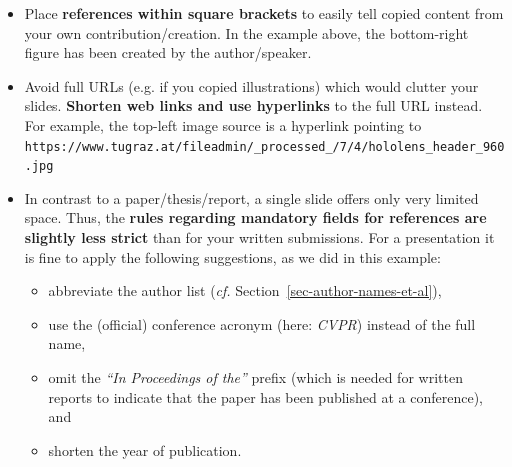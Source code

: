 \documentclass[11pt,a4paper]{article}
\begin{document}
\begin{goodexample}
  \label{ex-slide1}
  \begin{figure}[H]
    \centering%
    {%
      \setlength{\fboxsep}{0pt}%
      \setlength{\fboxrule}{2pt}%
    }
  \end{figure}
  
  \begin{itemize}[leftmargin=6pt]
    \item Place \textbf{references within square brackets} to easily tell copied content from your own contribution/creation. In the example above, the bottom-right figure has been created by the author/speaker.
    \item Avoid full URLs (e.g. if you copied illustrations) which would clutter your slides. \textbf{Shorten web links and use hyperlinks} to the full URL instead. For example, the top-left image source {} is a hyperlink pointing to {\tiny\texttt{https://www.tugraz.at/fileadmin/\_processed\_/7/4/hololens\_header\_960.jpg}}
    \item In contrast to a paper/thesis/report, a single slide offers only very limited space. Thus, the \textbf{rules regarding mandatory fields for references are slightly less strict} than for your written submissions.
    For a presentation it is fine to apply the following suggestions, as we did in this example:
    \begin{itemize}[leftmargin=12pt]
      \item abbreviate the author list (\emph{cf.} Section~\ref{sec-author-names-et-al}),
      \item use the (official) conference acronym (here: \emph{CVPR}) instead of the full name,
      \item omit the \emph{``In Proceedings of the''} prefix (which is needed for written reports to indicate that the paper has been published at a conference), and
      \item shorten the year of publication.
    \end{itemize}
  \end{itemize}
\end{goodexample}
\end{document}
